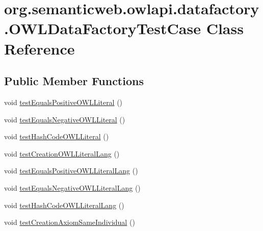 \hypertarget{classorg_1_1semanticweb_1_1owlapi_1_1datafactory_1_1_o_w_l_data_factory_test_case}{\section{org.\-semanticweb.\-owlapi.\-datafactory.\-O\-W\-L\-Data\-Factory\-Test\-Case Class Reference}
\label{classorg_1_1semanticweb_1_1owlapi_1_1datafactory_1_1_o_w_l_data_factory_test_case}
}
\subsection*{Public Member Functions}
\begin{DoxyCompactItemize}
\item 
void \hyperlink{classorg_1_1semanticweb_1_1owlapi_1_1datafactory_1_1_o_w_l_data_factory_test_case_ab38cb2d6c298fa06532dbc91e9a8f656}{test\-Equals\-Positive\-O\-W\-L\-Literal} ()
\item 
void \hyperlink{classorg_1_1semanticweb_1_1owlapi_1_1datafactory_1_1_o_w_l_data_factory_test_case_aa691f3aab6d21054e3655aba7253ab39}{test\-Equals\-Negative\-O\-W\-L\-Literal} ()
\item 
void \hyperlink{classorg_1_1semanticweb_1_1owlapi_1_1datafactory_1_1_o_w_l_data_factory_test_case_a3515c6eddc2469a03c2e776ebcfa9730}{test\-Hash\-Code\-O\-W\-L\-Literal} ()
\item 
void \hyperlink{classorg_1_1semanticweb_1_1owlapi_1_1datafactory_1_1_o_w_l_data_factory_test_case_a4c4241fe06251fdd508078c364210993}{test\-Creation\-O\-W\-L\-Literal\-Lang} ()
\item 
void \hyperlink{classorg_1_1semanticweb_1_1owlapi_1_1datafactory_1_1_o_w_l_data_factory_test_case_a49315298c967556b86c9013229bc3b11}{test\-Equals\-Positive\-O\-W\-L\-Literal\-Lang} ()
\item 
void \hyperlink{classorg_1_1semanticweb_1_1owlapi_1_1datafactory_1_1_o_w_l_data_factory_test_case_a4bc479a5688dd218735f0db2082545a9}{test\-Equals\-Negative\-O\-W\-L\-Literal\-Lang} ()
\item 
void \hyperlink{classorg_1_1semanticweb_1_1owlapi_1_1datafactory_1_1_o_w_l_data_factory_test_case_a4da437e9972d3242bf97c0ada0948e9a}{test\-Hash\-Code\-O\-W\-L\-Literal\-Lang} ()
\item 
void \hyperlink{classorg_1_1semanticweb_1_1owlapi_1_1datafactory_1_1_o_w_l_data_factory_test_case_a9433d4adfb3a1220bdd799234c1508a5}{test\-Creation\-Axiom\-Same\-Individual} ()

\end{DoxyCompactItemize}
